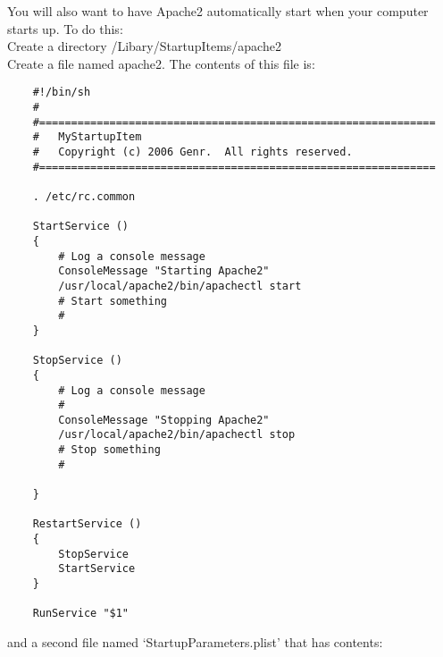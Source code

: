 You will also want to have Apache2 automatically start when your computer starts up.  To do this:\\

Create a directory /Libary/StartupItems/apache2\\
Create a file named apache2.  The contents of this file is:

\begin{verbatim}
	#!/bin/sh
	#
	#==============================================================
	#	MyStartupItem
	#	Copyright (c) 2006 Genr.  All rights reserved.
	#==============================================================

	. /etc/rc.common

	StartService ()
	{
		# Log a console message
		ConsoleMessage "Starting Apache2"
		/usr/local/apache2/bin/apachectl start
		# Start something
		#
	}

	StopService ()
	{
		# Log a console message
		#
		ConsoleMessage "Stopping Apache2"
		/usr/local/apache2/bin/apachectl stop
		# Stop something
		#

	}

	RestartService () 
	{ 
		StopService
		StartService
	}

	RunService "$1"
\end{verbatim}

and a second file named `StartupParameters.plist' that has contents:

